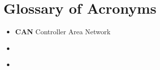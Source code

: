 \chapter*{Glossary of Acronyms}

\begin{itemize}
    \item \textbf{CAN} Controller Area Network
    \item \textbf{} 

    \newpage
    \thispagestyle{acronyms}
    \item \textbf{} 

\end{itemize}

\newpage







